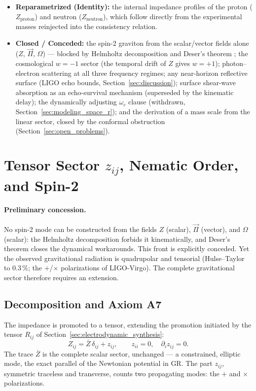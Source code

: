 \documentclass[11pt,a4paper]{article}
\theoremstyle{plain}
\theoremstyle{remark}
\begin{document}
\begin{itemize}
    \item \textbf{Reparametrized (Identity):} the internal impedance profiles of the proton ($Z_{\text{proton}}$) and neutron ($Z_{\text{neutron}}$), which follow directly from the experimental masses reinjected into the consistency relation.
    \item \textbf{Closed / Conceded:} the spin-2 graviton from the scalar/vector fields alone ($Z$, $\vec{\Pi}$, $\Omega$) --- blocked by Helmholtz decomposition and Deser's theorem \cite{deser1970}; the cosmological $w = -1$ sector (the temporal drift of $Z$ gives $w = +1$); photon--electron scattering at all three frequency regimes; any near-horizon reflective surface (LIGO echo bounds, Section~\ref{sec:discussion}); surface shear-wave absorption as an echo-survival mechanism (superseded by the kinematic delay); the dynamically adjusting $\omega_c$ clause (withdrawn, Section~\ref{sec:modeling_space_r}); and the derivation of a mass scale from the linear sector, closed by the conformal obstruction (Section~\ref{sec:open_problems}).
\end{itemize}

\section{Tensor Sector $z_{ij}$, Nematic Order, and Spin-2}
\label{sec:tensor_sector}

\paragraph{Preliminary concession.} No spin-2 mode can be constructed from the fields $Z$ (scalar), $\vec{\Pi}$ (vector), and $\Omega$ (scalar): the Helmholtz decomposition forbids it kinematically, and Deser's theorem \cite{deser1970} closes the dynamical workarounds. This front is explicitly conceded. Yet the observed gravitational radiation is quadrupolar and tensorial (Hulse--Taylor to $0.3\,\%$; the $+$/$\times$ polarizations of LIGO-Virgo). The complete gravitational sector therefore requires an extension.

\subsection{Decomposition and Axiom A7}
The impedance is promoted to a tensor, extending the promotion initiated by the tensor $R_{ij}$ of Section~\ref{sec:electrodynamic_synthesis}:
\begin{equation}
Z_{ij} = \bar{Z}\,\delta_{ij} + z_{ij}, \qquad z_{ii} = 0, \quad \partial_i z_{ij} = 0.
\end{equation}
The trace $\bar{Z}$ is the complete scalar sector, unchanged --- a constrained, elliptic mode, the exact parallel of the Newtonian potential in GR. The part $z_{ij}$, symmetric traceless and transverse, counts two propagating modes: the $+$ and $\times$ polarizations.
\end{document}
